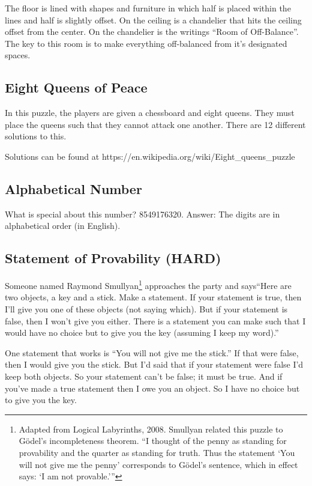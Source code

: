 The floor is lined with shapes and furniture in which half is placed within the lines and half is slightly offset. On the ceiling is a chandelier that hits the ceiling offset from the center. On the chandelier is the writings ``Room of Off-Balance''. The key to this room is to make everything off-balanced from it's designated spaces.

\subsection{Eight Queens of Peace}

In this puzzle, the players are given a chessboard and eight queens. They must place the queens such that they cannot attack one another. There are 12 different solutions to this.

Solutions can be found at https://en.wikipedia.org/wiki/Eight\_queens\_puzzle

\subsection{Alphabetical Number}

What is special about this number? 8549176320. Answer: The digits are in alphabetical order (in English).

\subsection{Statement of Provability (HARD)}
	
Someone named Raymond Smullyan\footnote{Adapted from Logical Labyrinths, 2008. Smullyan related this puzzle to G\"{o}del’s incompleteness theorem. “I thought of the penny as standing for provability and the quarter as standing for truth. Thus the statement ‘You will not give me the penny’ corresponds to G\"{o}del’s sentence, which in effect says: ‘I am not provable.'”} approaches the party and says``Here are two objects, a key and a stick. Make a statement. If your statement is true, then I’ll give you one of these objects (not saying which). But if your statement is false, then I won’t give you either. There is a statement you can make such that I would have no choice but to give you the key (assuming I keep my word).''

One statement that works is “You will not give me the stick.” If that were false, then I would give you the stick. But I’d said that if your statement were false I’d keep both objects. So your statement can’t be false; it must be true. And if you’ve made a true statement then I owe you an object. So I have no choice but to give you the key.

